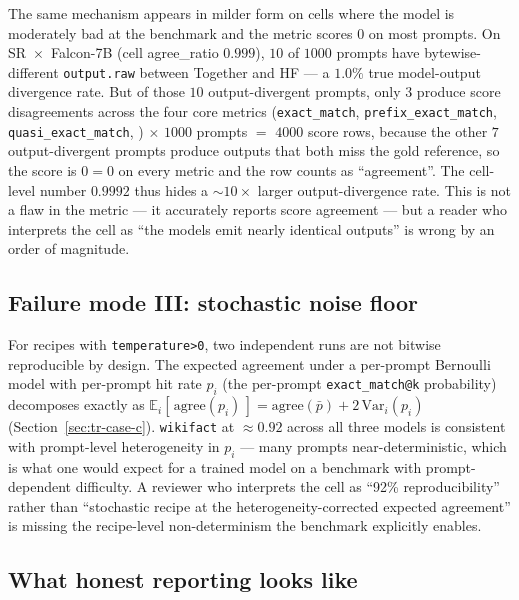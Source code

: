 \documentclass[11pt]{article}
\begin{document}
The same mechanism appears in milder form on cells where the model
  is moderately bad at the benchmark and the metric scores $0$ on
  most prompts.
On SR~$\times$~Falcon-7B (cell agree\_ratio $0.999$), $10$ of
  $1000$ prompts have bytewise-different \texttt{output.raw} between
  Together and HF --- a $1.0\%$ true model-output divergence rate.
But of those $10$ output-divergent prompts, only $3$ produce score
  disagreements across the four core metrics
  (\texttt{exact\_match}, \texttt{prefix\_exact\_match},
  \texttt{quasi\_exact\_match}, )
  $\times$ $1000$ prompts $=$ $4000$ score rows, because the other
  $7$ output-divergent prompts produce outputs that both miss the
  gold reference, so the score is $0=0$ on every metric and the row
  counts as ``agreement''.
The cell-level number $0.9992$ thus hides a $\sim 10\times$ larger
  output-divergence rate.
This is not a flaw in the metric --- it accurately reports score
  agreement --- but a reader who interprets the cell as ``the models
  emit nearly identical outputs'' is wrong by an order of magnitude.

\subsection{Failure mode III: stochastic noise floor}
\label{sec:tr-microavg-stochastic}

For recipes with \texttt{temperature>0}, two independent runs are not
  bitwise reproducible by design.
The expected agreement under a per-prompt Bernoulli model with
  per-prompt hit rate $p_i$ (the per-prompt
  \texttt{exact\_match@k} probability) decomposes exactly as
  $\mathbb{E}_i[\,\text{agree}(p_i)\,] = \text{agree}(\bar p) + 2\,
  \mathrm{Var}_i(p_i)$
  (Section~\ref{sec:tr-case-c}).
\texttt{wikifact} at $\approx 0.92$ across all three models is
  consistent with prompt-level heterogeneity in $p_i$ --- many prompts
  near-deterministic, which is what one would expect for a trained
  model on a benchmark with prompt-dependent difficulty.
A reviewer who interprets the cell as ``92\% reproducibility'' rather
  than ``stochastic recipe at the heterogeneity-corrected expected
  agreement'' is missing the recipe-level non-determinism the
  benchmark explicitly enables.

\subsection{What honest reporting looks like}
\label{sec:tr-microavg-honest}
\end{document}
